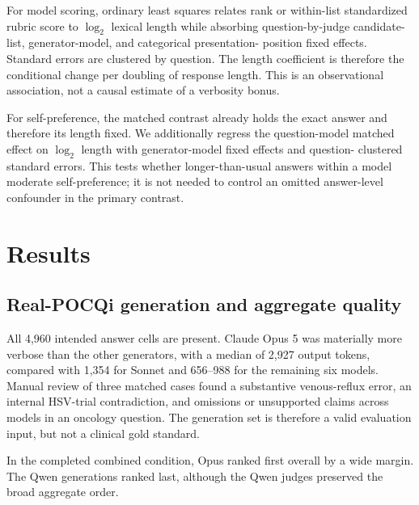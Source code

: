 \documentclass[11pt]{article}
\begin{document}
For model scoring, ordinary least squares relates rank or within-list
standardized rubric score to $\log_2$ lexical length while absorbing
question-by-judge candidate-list, generator-model, and categorical presentation-
position fixed effects. Standard errors are clustered by question. The length
coefficient is therefore the conditional change per doubling of response
length. This is an observational association, not a causal estimate of a
verbosity bonus.

For self-preference, the matched contrast already holds the exact answer and
therefore its length fixed. We additionally regress the question-model matched
effect on $\log_2$ length with generator-model fixed effects and question-
clustered standard errors. This tests whether longer-than-usual answers within
a model moderate self-preference; it is not needed to control an omitted
answer-level confounder in the primary contrast.

\section{Results}

\subsection{Real-POCQi generation and aggregate quality}

All 4,960 intended answer cells are present. Claude Opus 5 was materially more
verbose than the other generators, with a median of 2,927 output tokens,
compared with 1,354 for Sonnet and 656--988 for the remaining six models.
Manual review of three matched cases found a substantive venous-reflux error,
an internal HSV-trial contradiction, and omissions or unsupported claims
across models in an oncology question. The generation set is therefore a valid
evaluation input, but not a clinical gold standard.

In the completed combined condition, Opus ranked first overall by a wide
margin. The Qwen generations ranked last, although the Qwen judges preserved
the broad aggregate order.
\end{document}
